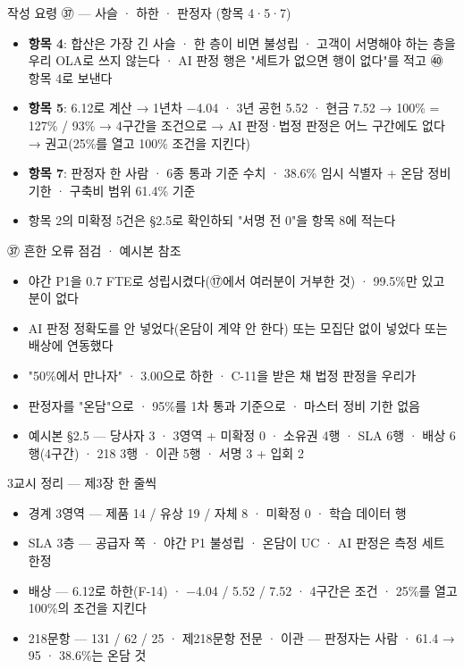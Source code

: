 \begin{frame}{작성 요령 ㊲ — 사슬 · 하한 · 판정자 (항목 4·5·7)}
\begin{itemize}
\item \textbf{항목 4}: 합산은 가장 긴 사슬 · 한 층이 비면 불성립 · 고객이 서명해야 하는 층을 우리 OLA로 쓰지 않는다 · AI 판정 행은 "세트가 없으면 행이 없다"를 적고 ㊵ 항목 4로 보낸다
\item \textbf{항목 5}: 6.12로 계산 → 1년차 $-$4.04 · 3년 공헌 5.52 · 현금 7.52 → 100\% = 127\% / 93\% → 4구간을 조건으로 → AI 판정·법정 판정은 어느 구간에도 없다 → 권고(25\%를 열고 100\% 조건을 지킨다)
\item \textbf{항목 7}: 판정자 한 사람 · 6종 통과 기준 수치 · 38.6\% 임시 식별자 + 온담 정비 기한 · 구축비 범위 61.4\% 기준
\item 항목 2의 미확정 5건은 §2.5로 확인하되 "서명 전 0"을 항목 8에 적는다
\end{itemize}
\end{frame}

\begin{frame}{㊲ 흔한 오류 점검 · 예시본 참조}
\begin{itemize}
\item 야간 P1을 0.7 FTE로 성립시켰다(⑰에서 여러분이 거부한 것) · 99.5\%만 있고 분이 없다
\item AI 판정 정확도를 안 넣었다(온담이 계약 안 한다) 또는 모집단 없이 넣었다 또는 배상에 연동했다
\item "50\%에서 만나자" · 3.00으로 하한 · C-11을 받은 채 법정 판정을 우리가
\item 판정자를 "온담"으로 · 95\%를 1차 통과 기준으로 · 마스터 정비 기한 없음
\item 예시본 §2.5 — 당사자 3 · 3영역 + 미확정 0 · 소유권 4행 · SLA 6행 · 배상 6행(4구간) · 218 3행 · 이관 5행 · 서명 3 + 입회 2
\end{itemize}
\end{frame}

\begin{frame}{3교시 정리 — 제3장 한 줄씩}
\begin{itemize}
\item 경계 3영역 — 제품 14 / 유상 19 / 자체 8 · 미확정 0 · 학습 데이터 행
\item SLA 3층 — 공급자 쪽 · 야간 P1 불성립 · 온담이 UC · AI 판정은 측정 세트 한정
\item 배상 — 6.12로 하한(F-14) · $-$4.04 / 5.52 / 7.52 · 4구간은 조건 · 25\%를 열고 100\%의 조건을 지킨다
\item 218문항 — 131 / 62 / 25 · 제218문항 전문 · 이관 — 판정자는 사람 · 61.4 → 95 · 38.6\%는 온담 것
\end{itemize}
\end{frame}


